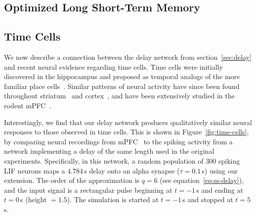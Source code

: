 

\subsection{Optimized Long Short-Term Memory}
\label{sec:delay-lstm}

\subsection{Time Cells}
\label{sec:time-cells}

We now describe a connection between the delay network from section~\ref{sec:delay} and recent neural evidence regarding time cells.
Time cells were initially discovered in the hippocampus and proposed as temporal analogs of the more familiar place cells~\citep{eichenbaum2014}.
Similar patterns of neural activity have since been found throughout striatum~\citep{mello2015scalable} and cortex~\citep{luczak2015packet}, and have been extensively studied in the rodent mPFC~\citep{kim2013neural, tiganj2016sequential}.

Interestingly, we find that our delay network produces qualitatively similar neural responses to those observed in time cells.
This is shown in Figure~\ref{fig:time-cells}, by comparing neural recordings from mPFC~\citep[][Figure~4~C,D]{tiganj2016sequential} to the spiking activity from a network implementing a delay of the same length used in the original experiments.
Specifically, in this network, a random population of $300$ spiking LIF neurons maps a $4.784$\,s delay onto an alpha synapse ($\tau = 0.1$\,s) using our extension.
The order of the approximation is $q = 6$ (see equation~\ref{eq:ss-delay}), and the input signal is a rectangular pulse beginning at $t = -1$\,s and ending at $t = 0$\,s (height $= 1.5$).
The simulation is started at $t = -1$\,s and stopped at $t = 5$\,s.

